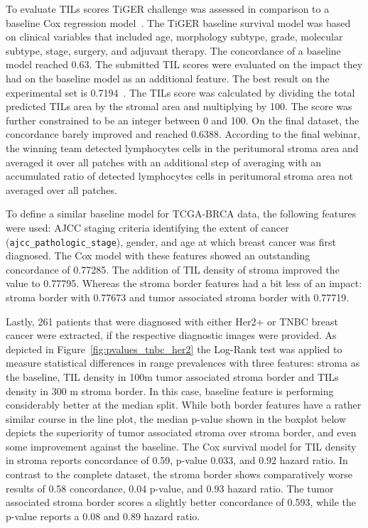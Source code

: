 To evaluate TILs scores TiGER challenge was assessed in comparison to a baseline Cox regression model~\cite{home}.
The TiGER baseline survival model was based on clinical variables that included age, morphology subtype, grade, molecular subtype, stage, surgery, and adjuvant therapy. The concordance of a baseline model reached 0.63. The submitted TIL scores were evaluated on the impact they had on the baseline model as an additional feature. The best result on the experimental set is 0.7194~\cite{shephard2022tiager}.
The TILs score was calculated by dividing the total predicted TILs area by the stromal area and multiplying by 100.
The score was further constrained to be an integer between 0 and 100.
On the final dataset, the concordance barely improved and reached 0.6388. According to the final webinar, the winning team detected lymphocytes cells in the peritumoral stroma area and averaged it over all patches with an additional step of averaging with an accumulated ratio of detected lymphocytes cells in peritumoral stroma area not averaged over all patches.

To define a similar baseline model for TCGA-BRCA data, the following features were used: AJCC staging criteria identifying the extent of cancer (\verb+ajcc_pathologic_stage+), gender, and age at which breast cancer was first diagnosed. The Cox model with these features showed an outstanding concordance of 0.77285. The addition of TIL density of stroma improved the value to 0.77795.
Whereas the stroma border features had a bit less of an impact: stroma border with 0.77673 and tumor associated stroma border with 0.77719.

Lastly, 261 patients that were diagnosed with either Her2+ or TNBC breast cancer were extracted, if the respective diagnostic images were provided. As depicted in Figure~\ref*{fig:pvalues_tnbc_her2} the Log-Rank test was applied to measure statistical differences in range prevalences with three features: stroma as the baseline, TIL density in 100\textmu m tumor associated stroma border and TILs density in 300 \textmu m stroma border.
In this case, baseline feature is performing considerably better at the median split. While both border features have a rather similar course in the line plot, the median p-value shown in the boxplot below depicts the superiority of tumor associated stroma over stroma border, and 
even some improvement against the baseline. The Cox survival model for TIL density in stroma reports concordance of 0.59, p-value 0.033, and 0.92 hazard ratio. In contrast to the complete dataset, the stroma border shows comparatively worse results of 0.58 concordance, 0.04 p-value, and 0.93 hazard ratio.
The tumor associated stroma border scores a slightly better concordance of 0.593, while the p-value reports a 0.08 and 0.89 hazard ratio.

